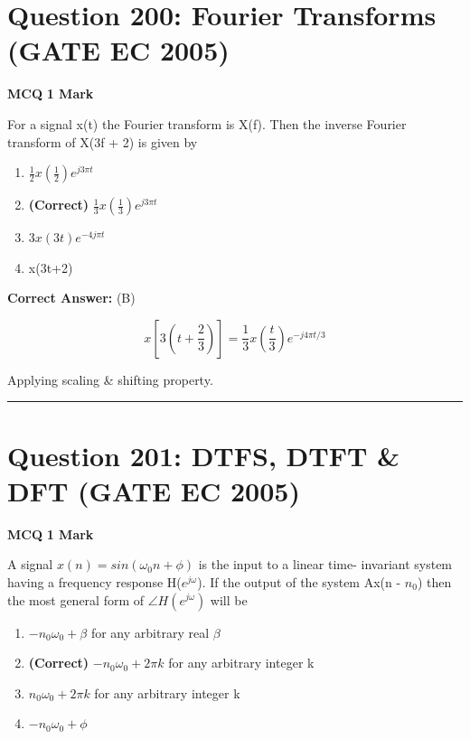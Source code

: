\documentclass[11pt,a4paper]{article}
\begin{document}
\section*{Question 200: Fourier Transforms (GATE EC 2005)}
\noindent \textbf{\color{primary}MCQ} \hfill \textbf{\color{secondary}1 Mark}


\noindent For a signal x(t) the Fourier transform is X(f). Then the inverse Fourier
transform of X(3f + 2) is given by


\begin{enumerate}[label=(\Alph*)]
    \item $\frac{1}{2}x(\frac{1}{2})e^{j3\pi t}$
    \item \textbf{(Correct)} $\frac{1}{3}x(\frac{1}{3})e^{j3\pi t}$
    \item $3x(3t)e^{-4j\pi t}$
    \item x(3t+2)
\end{enumerate}

\noindent \textbf{Correct Answer:} (B)

\begin{tcolorbox}[solbox, title=Detailed Solution -- Question 200]
\[
x\left[3\left(t+\frac{2}{3}\right)\right]=\frac{1}{3} x\left(\frac{t}{3}\right) e^{-j 4 \pi t / 3}
\]

Applying scaling \& shifting property.
\end{tcolorbox}

\vspace{1.5em}
\hrule
\vspace{1.5em}

\section*{Question 201: DTFS, DTFT \& DFT (GATE EC 2005)}
\noindent \textbf{\color{primary}MCQ} \hfill \textbf{\color{secondary}1 Mark}


\noindent A signal $x(n)=sin(\omega _{0}n+\phi )$ is the input to a linear time- invariant system having a frequency response H($e^{j\omega }$). If the output of the system Ax(n - $n_{0}$) then the most general form of $\angle H(e^{j\omega })$ will be


\begin{enumerate}[label=(\Alph*)]
    \item $-n_{0}\omega _{0}+\beta$ for any arbitrary real $\beta$
    \item \textbf{(Correct)} $-n_{0}\omega _{0}+2\pi k$ for any arbitrary integer k
    \item $n_{0}\omega _{0}+2\pi k$ for any arbitrary integer k
    \item $-n_{0}\omega _{0}+\phi$
\end{enumerate}
\end{document}
